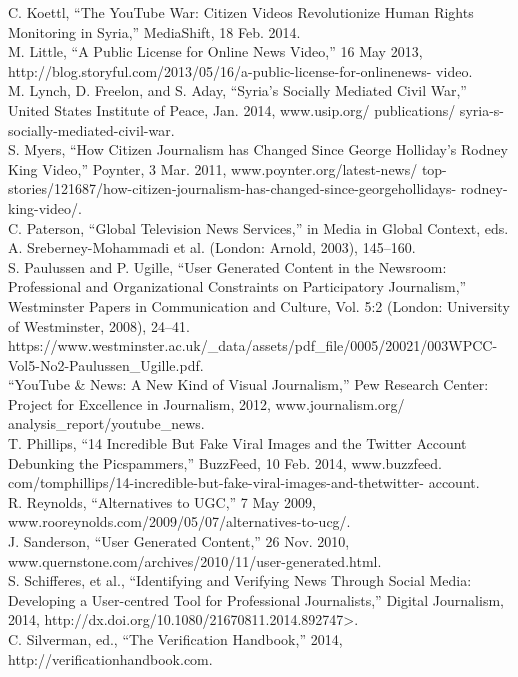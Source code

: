 \begin{enumerate}
C. Koettl, ``The YouTube War: Citizen Videos Revolutionize Human Rights
Monitoring in Syria,'' MediaShift, 18 Feb. 2014.\\
M. Little, ``A Public License for Online News Video,'' 16 May 2013,
http://blog.storyful.com/2013/05/16/a-public-license-for-onlinenews-
video.\\
M. Lynch, D. Freelon, and S. Aday, ``Syria's Socially Mediated Civil War,''
United States Institute of Peace, Jan. 2014, www.usip.org/ publications/
syria-s-socially-mediated-civil-war.\\
S. Myers, ``How Citizen Journalism has Changed Since George Holliday's
Rodney King Video,'' Poynter, 3 Mar. 2011, www.poynter.org/latest-news/
top-stories/121687/how-citizen-journalism-has-changed-since-georgehollidays-
rodney-king-video/.\\
C. Paterson, ``Global Television News Services,'' in Media in Global
Context, eds. A. Sreberney-Mohammadi et al. (London: Arnold, 2003),
145–160.\\
S. Paulussen and P. Ugille, ``User Generated Content in the Newsroom:
Professional and Organizational Constraints on Participatory Journalism,''
Westminster Papers in Communication and Culture, Vol. 5:2 (London:
University of Westminster, 2008), 24–41. https://www.westminster.ac.uk/_data/assets/pdf_file/0005/20021/003WPCC-Vol5-No2-Paulussen_Ugille.pdf.\\
``YouTube & News: A New Kind of Visual Journalism,'' Pew Research
Center: Project for Excellence in Journalism, 2012, www.journalism.org/
analysis_report/youtube_news.\\
T. Phillips, ``14 Incredible But Fake Viral Images and the Twitter Account
Debunking the Picspammers,'' BuzzFeed, 10 Feb. 2014, www.buzzfeed.
com/tomphillips/14-incredible-but-fake-viral-images-and-thetwitter-
account.\\
R. Reynolds, ``Alternatives to UGC,'' 7 May 2009,
www.rooreynolds.com/2009/05/07/alternatives-to-ucg/.\\
J. Sanderson, ``User Generated Content,'' 26 Nov. 2010,
www.quernstone.com/archives/2010/11/user-generated.html.\\
S. Schifferes, et al., ``Identifying and Verifying News Through Social Media:
Developing a User-centred Tool for Professional Journalists,'' Digital
Journalism, 2014, http://dx.doi.org/10.1080/21670811.2014.892747>.\\
C. Silverman, ed., ``The Verification Handbook,'' 2014,
http://verificationhandbook.com.\\

\end{enumerate}
